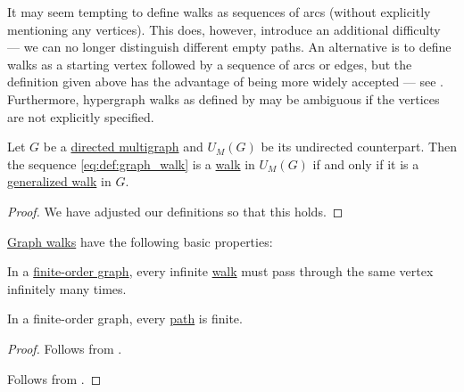 \begin{comments}
  \item It may seem tempting to define walks as sequences of arcs (without explicitly mentioning any vertices). This does, however, introduce an additional difficulty --- we can no longer distinguish different empty paths. An alternative is to define walks as a starting vertex followed by a sequence of arcs or edges, but the definition given above has the advantage of being more widely accepted --- see . Furthermore, hypergraph walks as defined by \cite[300]{ЕмеличевИПр1990ТеорияГрафов} may be ambiguous if the vertices are not explicitly specified.
\end{comments}

\begin{proposition}\label{thm:walk_in_undirected_counterpart}
  Let \( G \) be a \hyperref[def:directed_multigraph]{directed multigraph} and \( \hyperref[def:graph_functors/multi_forgetful]{U_M}(G) \) be its undirected counterpart. Then the sequence \eqref{eq:def:graph_walk} is a \hyperref[def:graph_walk/undirected]{walk} in \( \hyperref[def:graph_functors/multi_forgetful]{U_M}(G) \) if and only if it is a \hyperref[def:graph_walk/generalized]{generalized walk} in \( G \).
\end{proposition}
\begin{proof}
  We have adjusted our definitions so that this holds.
\end{proof}

\begin{proposition}\label{thm:def:graph_walk}
  \hyperref[def:graph_walk]{Graph walks} have the following basic properties:
  \begin{thmenum}
     In a \hyperref[def:graph_cardinality/order]{finite-order graph}, every infinite \hyperref[def:graph_walk]{walk} must pass through the same vertex infinitely many times.

     In a finite-order graph, every \hyperref[def:graph_walk/path]{path} is finite.
  \end{thmenum}
\end{proposition}
\begin{proof}
   Follows from .

   Follows from .
\end{proof}

